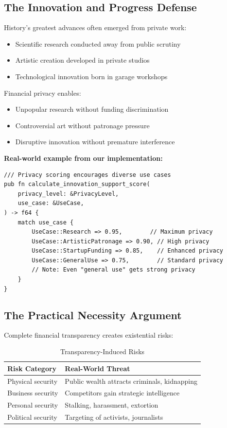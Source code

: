 \documentclass[12pt,a4paper]{article}
\begin{document}
\subsection{The Innovation and Progress Defense}

History's greatest advances often emerged from private work:
\begin{itemize}
\item Scientific research conducted away from public scrutiny
\item Artistic creation developed in private studios
\item Technological innovation born in garage workshops
\end{itemize}

Financial privacy enables:
\begin{itemize}
\item Unpopular research without funding discrimination
\item Controversial art without patronage pressure
\item Disruptive innovation without premature interference
\end{itemize}

\textbf{Real-world example from our implementation:}

\begin{lstlisting}[style=rustcode, caption=Supporting Innovation Through Privacy]
/// Privacy scoring encourages diverse use cases
pub fn calculate_innovation_support_score(
    privacy_level: &PrivacyLevel,
    use_case: &UseCase,
) -> f64 {
    match use_case {
        UseCase::Research => 0.95,        // Maximum privacy
        UseCase::ArtisticPatronage => 0.90, // High privacy
        UseCase::StartupFunding => 0.85,    // Enhanced privacy
        UseCase::GeneralUse => 0.75,        // Standard privacy
        // Note: Even "general use" gets strong privacy
    }
}
\end{lstlisting}

\subsection{The Practical Necessity Argument}

Complete financial transparency creates existential risks:

\begin{table}[h]
\centering
\begin{tabular}{ll}
\toprule
\textbf{Risk Category} & \textbf{Real-World Threat} \\
\midrule
Physical security & Public wealth attracts criminals, kidnapping \\
Business security & Competitors gain strategic intelligence \\
Personal security & Stalking, harassment, extortion \\
Political security & Targeting of activists, journalists \\
\bottomrule
\end{tabular}
\caption{Transparency-Induced Risks}
\end{table}
\end{document}
